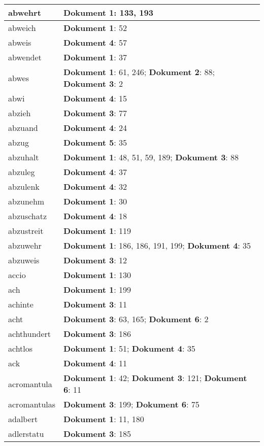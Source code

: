 \documentclass[a5paper]{article}
\begin{document}
\begin{longtable}[l]{|l|p{3in}|}
\hline
abwehrt & \textbf{Dokument 1}: 133, 193 \\
\hline
abweich & \textbf{Dokument 1}: 52 \\
\hline
abweis & \textbf{Dokument 4}: 57 \\
\hline
abwendet & \textbf{Dokument 1}: 37 \\
\hline
abwes & \textbf{Dokument 1}: 61, 246; \textbf{Dokument 2}: 88; \textbf{Dokument 3}: 2 \\
\hline
abwi & \textbf{Dokument 4}: 15 \\
\hline
abzieh & \textbf{Dokument 3}: 77 \\
\hline
abzuand & \textbf{Dokument 4}: 24 \\
\hline
abzug & \textbf{Dokument 5}: 35 \\
\hline
abzuhalt & \textbf{Dokument 1}: 48, 51, 59, 189; \textbf{Dokument 3}: 88 \\
\hline
abzuleg & \textbf{Dokument 4}: 37 \\
\hline
abzulenk & \textbf{Dokument 4}: 32 \\
\hline
abzunehm & \textbf{Dokument 1}: 30 \\
\hline
abzuschatz & \textbf{Dokument 4}: 18 \\
\hline
abzustreit & \textbf{Dokument 1}: 119 \\
\hline
abzuwehr & \textbf{Dokument 1}: 186, 186, 191, 199; \textbf{Dokument 4}: 35 \\
\hline
abzuweis & \textbf{Dokument 3}: 12 \\
\hline
accio & \textbf{Dokument 1}: 130 \\
\hline
ach & \textbf{Dokument 1}: 199 \\
\hline
achinte & \textbf{Dokument 3}: 11 \\
\hline
acht & \textbf{Dokument 3}: 63, 165; \textbf{Dokument 6}: 2 \\
\hline
achthundert & \textbf{Dokument 3}: 186 \\
\hline
achtlos & \textbf{Dokument 1}: 51; \textbf{Dokument 4}: 35 \\
\hline
ack & \textbf{Dokument 4}: 11 \\
\hline
acromantula & \textbf{Dokument 1}: 42; \textbf{Dokument 3}: 121; \textbf{Dokument 6}: 11 \\
\hline
acromantulas & \textbf{Dokument 3}: 199; \textbf{Dokument 6}: 75 \\
\hline
adalbert & \textbf{Dokument 1}: 11, 180 \\
\hline
adlerstatu & \textbf{Dokument 3}: 185 \\

\end{longtable}
\end{document}
